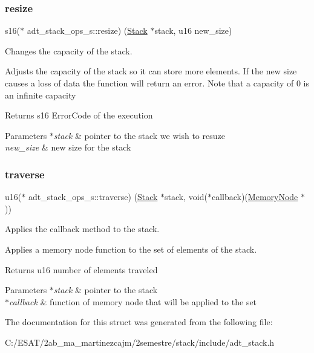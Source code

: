 \subsubsection{\texorpdfstring{resize}{resize}}
{\footnotesize\ttfamily s16($\ast$ adt\+\_\+stack\+\_\+ops\+\_\+s\+::resize) (\hyperlink{structadt__stack__s}{Stack} $\ast$stack, u16 new\+\_\+size)}



Changes the capacity of the stack. 

Adjusts the capacity of the stack so it can store more elements. If the new size causes a loss of data the function will return an error. Note that a capacity of 0 is an infinite capacity

\begin{DoxyReturn}{Returns}
s16 Error\+Code of the execution 
\end{DoxyReturn}

\begin{DoxyParams}{Parameters}
{\em $\ast$stack} & pointer to the stack we wish to resuze \\
\hline
{\em new\+\_\+size} & new size for the stack \\
\hline
\end{DoxyParams}
\mbox{\label{structadt__stack__ops__s_a87496a132c816759887ab1e3989f77be}} 
\subsubsection{\texorpdfstring{traverse}{traverse}}
{\footnotesize\ttfamily u16($\ast$ adt\+\_\+stack\+\_\+ops\+\_\+s\+::traverse) (\hyperlink{structadt__stack__s}{Stack} $\ast$stack, void($\ast$callback)(\hyperlink{structmemory__node__s}{Memory\+Node} $\ast$))}



Applies the callback method to the stack. 

Applies a memory node function to the set of elements of the stack.

\begin{DoxyReturn}{Returns}
u16 number of elements traveled 
\end{DoxyReturn}

\begin{DoxyParams}{Parameters}
{\em $\ast$stack} & pointer to the stack \\
\hline
{\em $\ast$callback} & function of memory node that will be applied to the set \\
\hline
\end{DoxyParams}


The documentation for this struct was generated from the following file\+:\begin{DoxyCompactItemize}
\item 
C\+:/\+E\+S\+A\+T/2ab\+\_\+ma\+\_\+martinezcajm/2semestre/stack/include/adt\+\_\+stack.\+h\end{DoxyCompactItemize}
